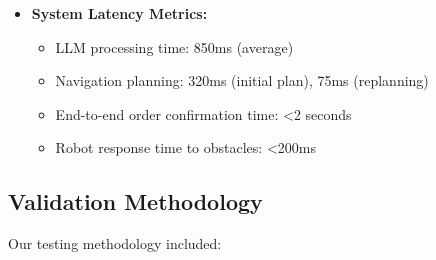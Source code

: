 \documentclass[12pt]{article}
\begin{document}
\begin{itemize}
    \item \textbf{System Latency Metrics:}
    \begin{itemize}
        \item LLM processing time: 850ms (average)
        \item Navigation planning: 320ms (initial plan), 75ms (replanning)
        \item End-to-end order confirmation time: <2 seconds
        \item Robot response time to obstacles: <200ms
    \end{itemize}
\end{itemize}

\subsection{Validation Methodology}

Our testing methodology included:
\end{document}
